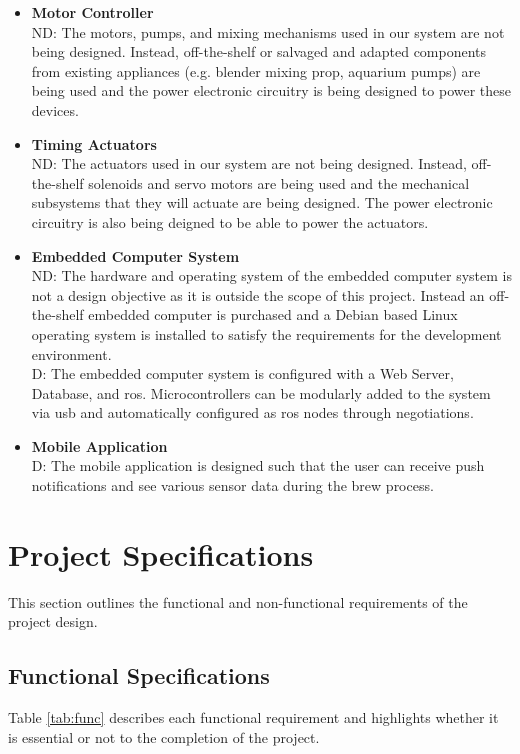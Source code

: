 \documentclass{article}
\begin{document}
\begin{itemize}
\item\textbf{Motor Controller}
\\ND: The motors, pumps, and mixing mechanisms used in our system are not being designed. Instead, off-the-shelf or salvaged and adapted components from existing appliances (e.g. blender mixing prop, aquarium pumps) are being used and the power electronic circuitry is being designed to power these devices.

\item\textbf{Timing Actuators}
\\ND: The actuators used in our system are not being designed. Instead, off-the-shelf solenoids and servo motors are being used and the mechanical subsystems that they will actuate are being designed. The power electronic circuitry is also being deigned to be able to power the actuators.

\item\textbf{Embedded Computer System}
\\ND: The hardware and operating system of the embedded computer system is not a design objective as it is outside the scope of this project. Instead an off-the-shelf embedded computer is purchased and a Debian based Linux operating system is installed to satisfy the requirements for the development environment.
\\D: The embedded computer system is configured with a Web Server, Database, and \gls{ros}.  Microcontrollers can be modularly added to the system via \gls{usb} and automatically configured as \gls{ros} nodes through negotiations.

\item\textbf{Mobile Application}
\\D: The mobile application is designed such that the user can receive push notifications and see various sensor data during the brew process.
\end{itemize}

\section{Project Specifications}
This section outlines the functional and non-functional requirements of the project design.
\subsection{Functional Specifications}\label{sec:functional}
Table \ref{tab:func} describes each functional requirement and highlights whether it is essential or not to the completion of the project.
\end{document}
